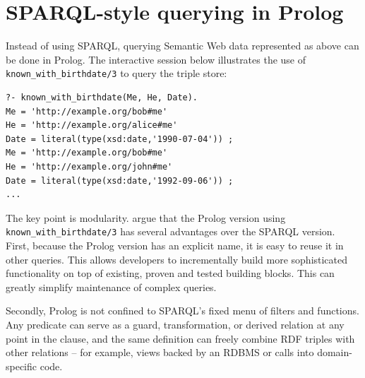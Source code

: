 
\section{SPARQL-style querying in Prolog}\label{sec:instead-of-sparql}

\noindent Instead of using SPARQL, querying Semantic Web data represented as above can be done in Prolog. The interactive session below illustrates the use of \texttt{known\_with\_birthdate/3} to query the triple store:

\begin{verbatim}
?- known_with_birthdate(Me, He, Date).
Me = 'http://example.org/bob#me'
He = 'http://example.org/alice#me'
Date = literal(type(xsd:date,'1990-07-04')) ;
Me = 'http://example.org/bob#me'
He = 'http://example.org/john#me'
Date = literal(type(xsd:date,'1992-09-06')) ;
...
\end{verbatim}

\noindent The key point is modularity. \citet{wielemaker2016cliopatria} argue that the Prolog version using \texttt{known\_with\_birthdate/3} has several advantages over the SPARQL version. First, because the Prolog version has an explicit name, it is easy to reuse it in other queries. This allows developers to incrementally build more sophisticated functionality on top of existing, proven and tested building blocks. This can greatly simplify maintenance of complex queries.

Secondly, Prolog is not confined to SPARQL's fixed menu of filters and functions. Any predicate can serve as a guard, transformation, or derived relation at any point in the clause, and the same definition can freely combine RDF triples with other relations -- for example, views backed by an RDBMS or calls into domain-specific code.


